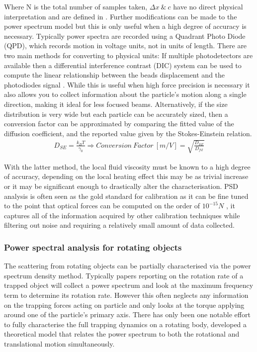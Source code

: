 Where N is the total number of samples taken, $\Delta x \ \& \ c$ 
have no direct physical interpretation and are defined in 
\cite{BergSoerensen2004}. Further modifications can be made to the 
power spectrum model but this is only useful when a high degree of 
accuracy is necessary. Typically power spectra are recorded using 
a Quadrant Photo Diode (QPD), which records motion in voltage units, 
not in units of length. There are two main methods for converting to
physical units: If multiple photodetectors are available then a 
differential interference contrast (DIC) system can be used to compute
the linear relationship between the beads displacement and the photodiodes
signal \cite{Capitanio2002}. While this is useful when high force precision 
is necessary it also allows you to collect information about the particle's 
motion along a single direction, making it ideal for less focused beams. 
Alternatively, if the size distribution is very wide but each particle can be 
accurately sized, then a conversion factor can be approximated by comparing 
the fitted value of the diffusion coefficient, and the reported value 
given by the Stokes-Einstein relation.
\begin{align}
	\label{eq:conversion_factor}
	D_{SE} = \frac{k_BT}{\gamma_0} \Rightarrow Conversion\ Factor \ [m/V]= \sqrt{\frac{D_{SE}}{D_{fit}}}
\end{align}

With the latter method, the local fluid viscosity must be known to a 
high degree of accuracy, depending on the local heating effect this 
may be as trivial increase or it may be significant enough to drastically 
alter the characterisation. PSD analysis is often seen as the gold 
standard for calibration as it can be fine tuned to the point that 
optical forces can be computed on the order of $10^{-15} N$ 
\cite{BergSoerensen2004}, it captures all of the information acquired 
by other calibration techniques while filtering out noise and requiring 
a relatively small amount of data collected. 

\subsubsection{Power spectral analysis for rotating objects}
The scattering from rotating objects can be partially characterised via
the power spectrum density method. Typically papers reporting on the 
rotation rate of a trapped object will collect a power spectrum and look
at the maximum frequency term to determine its rotation rate. However this
often neglects any information on the trapping forces acting on particle
and only looks at the torque applying around one of the particle's primary 
axis. There has only been one notable effort to fully characterise the 
full trapping dynamics on a rotating body, \cite{Yogesha2012} developed 
a theoretical model that relates the power spectrum to both the 
rotational and translational motion simultaneously.

